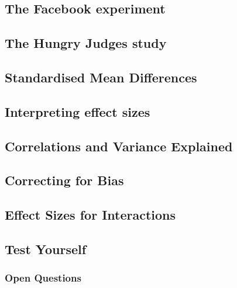 \documentclass[
  oneside]{krantz}
\begin{document}
\hypertarget{the-facebook-experiment}{%
\subsection{The Facebook experiment}\label{the-facebook-experiment}}

\hypertarget{the-hungry-judges-study}{%
\subsection{The Hungry Judges study}\label{the-hungry-judges-study}}

\hypertarget{cohend}{%
\subsection{Standardised Mean Differences}\label{cohend}}

\hypertarget{interpreting-effect-sizes}{%
\subsection{Interpreting effect sizes}\label{interpreting-effect-sizes}}

\hypertarget{correlations-and-variance-explained}{%
\subsection{Correlations and Variance
Explained}\label{correlations-and-variance-explained}}

\hypertarget{correcting-for-bias}{%
\subsection{Correcting for Bias}\label{correcting-for-bias}}

\hypertarget{effect-sizes-for-interactions}{%
\subsection{Effect Sizes for
Interactions}\label{effect-sizes-for-interactions}}

\hypertarget{test-yourself-4}{%
\subsection{Test Yourself}\label{test-yourself-4}}

\hypertarget{open-questions-4}{%
\subsubsection{Open Questions}\label{open-questions-4}}
\end{document}
